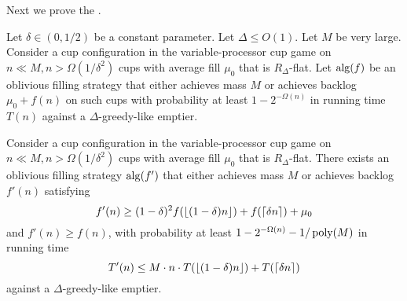 Next we prove the .

\begin{lemma}
  \label{lem:obliviousAmplification} 
  Let $\delta \in (0, 1/2)$ be a constant parameter. Let $\Delta
  \le O(1)$. Let $M$ be very large. Consider a cup configuration
  in the variable-processor cup game on $n\ll M, n >
  \Omega(1/\delta^2)$ cups with average fill $\mu_0$ that is
  $R_\Delta$-flat. Let $\operatorname{\text{\textup{alg}}}(f)$ be an oblivious filling strategy
  that either achieves mass $M$ or achieves backlog $\mu_0 +
  f(n)$ on such cups with probability at least $1-2^{-\Omega(n)}$
  in running time $T(n)$ against a $\Delta$-greedy-like emptier.

  Consider a cup configuration in the variable-processor cup game
  on $n\ll M, n > \Omega(1/\delta^2)$ cups with average fill
  $\mu_0$ that is $R_\Delta$-flat. There exists an oblivious
  filling strategy $\operatorname{\text{\textup{alg}}}(f')$ that either achieves mass $M$ or
  achieves backlog $f'(n)$ satisfying $$f'(n) \ge (1-\delta)^2
  f(\left\lfloor (1-\delta)n \right\rfloor) + f(\left\lceil \delta n \right\rceil) + \mu_0$$ and
  $f'(n) \ge f(n)$, with probability at least
  $1-2^{-\Omega(n)}-1/\operatorname{\text{poly}}(M)$ in running time $$T'(n) \le
  M\cdot n\cdot T(\left\lfloor (1-\delta)n \right\rfloor) + T(\left\lceil \delta n \right\rceil)$$
  against a $\Delta$-greedy-like emptier.
\end{lemma}

